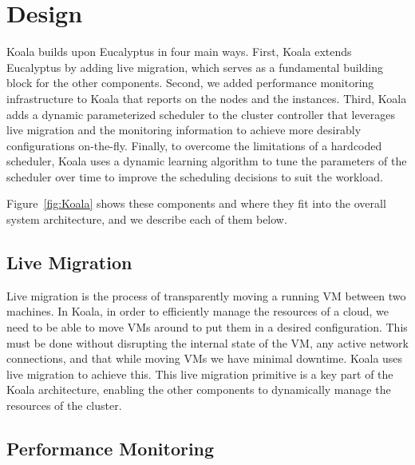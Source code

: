 \section{Design}

Koala builds upon Eucalyptus in four main ways.  First, Koala extends
Eucalyptus by adding live migration, which serves as a fundamental building
block for the other components.  Second, we added performance monitoring
infrastructure to Koala that reports on the nodes and the instances. Third,
Koala adds a dynamic parameterized scheduler to the cluster controller that
leverages live migration and the monitoring information to achieve more
desirably configurations on-the-fly.  Finally, to overcome the limitations of a
hardcoded scheduler, Koala uses a dynamic learning algorithm to tune the
parameters of the scheduler over time to improve the scheduling decisions to
suit the workload.

Figure~\ref{fig:Koala} shows these components and where they fit into the
overall system architecture, and we describe each of them below.


\subsection{Live Migration}
Live migration is the process of transparently moving a running VM between two
machines.  In Koala, in order to efficiently manage the resources of a cloud,
we need to be able to move VMs around to put them in a desired configuration.
This must be done without disrupting the internal state of the VM, any active
network connections, and that while moving VMs we have minimal downtime.  Koala
uses live migration to achieve this.  This live migration primitive is a key
part of the Koala architecture, enabling the other components to dynamically
manage the resources of the cluster.

\subsection{Performance Monitoring}

